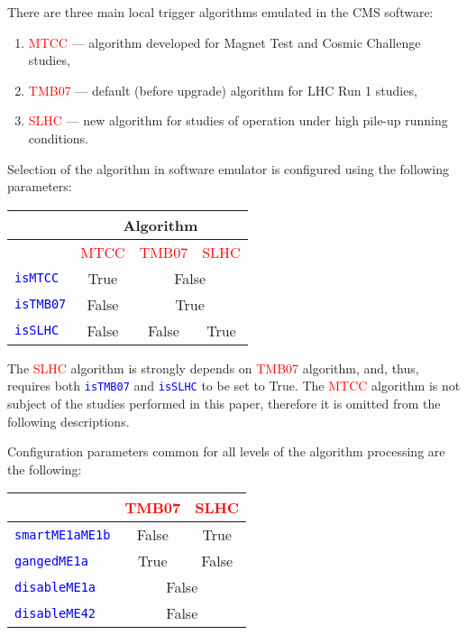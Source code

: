 There are three main local trigger algorithms emulated in the CMS software:
\begin{enumerate}
\item \textcolor{red}{MTCC} --- algorithm developed for Magnet Test and Cosmic Challenge studies,
\item \textcolor{red}{TMB07} --- default (before upgrade) algorithm for LHC Run 1 studies,
\item \textcolor{red}{SLHC} --- new algorithm for studies of operation under high pile-up running conditions.
\end{enumerate}
Selection of the algorithm in software emulator is configured using the following parameters:
\begin{center}
\begin{tabular}{|l|c|c|c|}
\hline
   & \multicolumn{3}{c|}{Algorithm}\\
\hline
   & \textcolor{red}{MTCC} & \textcolor{red}{TMB07} & \textcolor{red}{SLHC} \\
\hline
\hline
\textcolor{blue}{\texttt{isMTCC}} & True & \multicolumn{2}{c|}{False} \\
\hline
\textcolor{blue}{\texttt{isTMB07}} & False & \multicolumn{2}{c|}{True} \\
\hline
\textcolor{blue}{\texttt{isSLHC}}  & False & False & True \\
\hline
\end{tabular}
\end{center}
The \textcolor{red}{SLHC} algorithm is strongly depends on \textcolor{red}{TMB07} algorithm, and, thus, requires both \textcolor{blue}{\texttt{isTMB07}} and \textcolor{blue}{\texttt{isSLHC}} to be set to True. The \textcolor{red}{MTCC} algorithm is not subject of the studies performed in this paper, therefore it is omitted from the following descriptions.

Configuration parameters common for all levels of the algorithm processing are the following:
\begin{center}
\begin{tabular}{|l|c|c|}
\hline
   & \textcolor{red}{TMB07} & \textcolor{red}{SLHC} \\
\hline
\hline
\textcolor{blue}{\texttt{smartME1aME1b}} & False & True \\
\hline
\textcolor{blue}{\texttt{gangedME1a}} & True & False \\
\hline
\textcolor{blue}{\texttt{disableME1a}} & \multicolumn{2}{c|}{False} \\
\hline
\textcolor{blue}{\texttt{disableME42}} & \multicolumn{2}{c|}{False} \\
\hline
\end{tabular}
\end{center}


